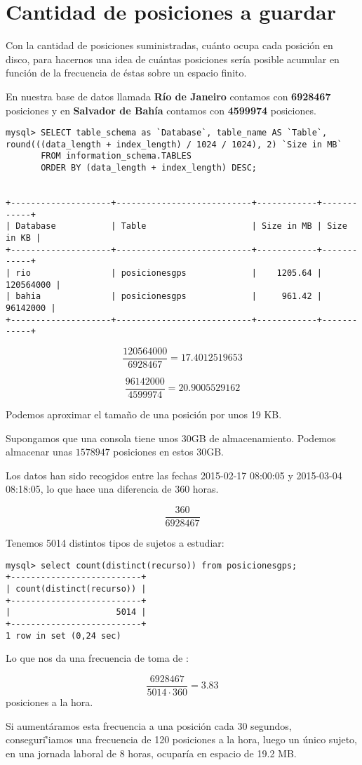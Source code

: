 \documentclass[a4paper, 12pt]{article}
\begin{document}
\section{Cantidad de posiciones a guardar}

Con la cantidad de posiciones suministradas, cu\'anto ocupa cada posici\'on en disco, para hacernos una idea de cu\'antas posiciones ser\'ia posible acumular en funci\'on de la frecuencia de \'estas sobre un espacio finito.

En nuestra base de datos llamada \textbf{R\'io de Janeiro} contamos con \textbf{6928467} posiciones y en \textbf{Salvador de Bah\'ia} contamos con \textbf{4599974} posiciones.

\begin{lstlisting}
mysql> SELECT table_schema as `Database`, table_name AS `Table`,  round(((data_length + index_length) / 1024 / 1024), 2) `Size in MB`  
	   FROM information_schema.TABLES  
	   ORDER BY (data_length + index_length) DESC;


+--------------------+---------------------------+------------+------------+
| Database           | Table                     | Size in MB | Size in KB |
+--------------------+---------------------------+------------+------------+
| rio                | posicionesgps             |    1205.64 |  120564000 |
| bahia              | posicionesgps             |     961.42 |   96142000 |
+--------------------+---------------------------+------------+------------+

\end{lstlisting}


$$\frac{120564000}{6928467} = 17.4012519653 $$

$$\frac{96142000}{4599974} = 20.9005529162 $$

Podemos aproximar el tama\~no de una posici\'on por unos 19 KB.

Supongamos que una consola tiene unos 30GB de almacenamiento. Podemos almacenar unas $1578947$ posiciones en estos 30GB. 

Los datos han sido recogidos entre las fechas 2015-02-17 08:00:05 y 2015-03-04 08:18:05, lo que hace una diferencia de 360 horas.


$$ \frac{360}{6928467}$$

Tenemos 5014 distintos tipos de sujetos a estudiar:

\begin{lstlisting}
mysql> select count(distinct(recurso)) from posicionesgps;
+--------------------------+
| count(distinct(recurso)) |
+--------------------------+
|                     5014 |
+--------------------------+
1 row in set (0,24 sec)

\end{lstlisting}

Lo que nos da una frecuencia de toma de :

$$ \frac{6928467}{5014 \cdot 360} = 3.83$$ posiciones a la hora.

Si aument\'aramos esta frecuencia a una posici\'on cada 30 segundos, conseguri\r'iamos una frecuencia de 120 posiciones a la hora, luego un \'unico sujeto, en una jornada laboral de 8 horas, ocupar\'ia en espacio de 19.2 MB. 
\end{document}
